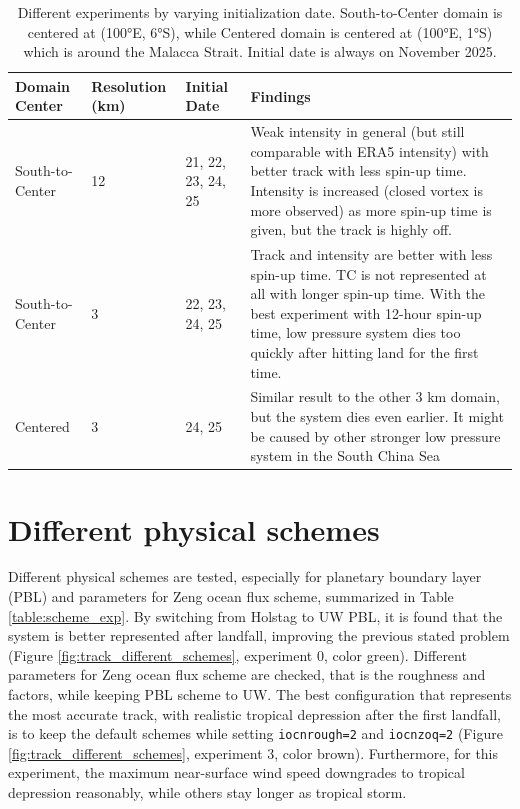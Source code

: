 \begin{table}[h] 
\centering
\begin{tabular}{p{3cm} p{2cm} p{2cm} p{7cm}}
\hline
\textbf{Domain Center} & \textbf{Resolution (km)} & \textbf{Initial Date} & \textbf{Findings} \\
\hline
South-to-Center & 12  & 21, 22, 23, 24, 25 & Weak intensity in general (but still comparable with ERA5 intensity) with better track with less spin-up time. Intensity is increased (closed vortex is more observed) as more spin-up time is given, but the track is highly off. \\
South-to-Center & 3 & 22, 23, 24, 25 & Track and intensity are better with less spin-up time. TC is not represented at all with longer spin-up time. With the best experiment with 12-hour spin-up time, low pressure system dies too quickly after hitting land for the first time. \\
Centered & 3 & 24, 25 & Similar result to the other 3 km domain, but the system dies even earlier. It might be caused by other stronger low pressure system in the South China Sea\\
\hline
\end{tabular}
\caption{Different experiments by varying initialization date. South-to-Center domain is centered at (100°E, 6°S), while Centered domain is centered at (100°E, 1°S) which is around the Malacca Strait. Initial date is always on November 2025.}
\label{table:diff_init}
\end{table}

\section*{Different physical schemes}

Different physical schemes are tested, especially for planetary boundary layer (PBL) and parameters for Zeng ocean flux scheme, summarized in Table \ref{table:scheme_exp}. By switching from Holstag to UW PBL, it is found that the system is better represented after landfall, improving the previous stated problem (Figure \ref{fig:track_different_schemes}, experiment 0, color green). Different parameters for Zeng ocean flux scheme are checked, that is the roughness and factors, while keeping PBL scheme to UW. The best configuration that represents the most accurate track, with realistic tropical depression after the first landfall, is to keep the default schemes while setting \texttt{iocnrough=2} and \texttt{iocnzoq=2} (Figure \ref{fig:track_different_schemes}, experiment 3, color brown). Furthermore, for this experiment, the maximum near-surface wind speed downgrades to tropical depression reasonably, while others stay longer as tropical storm.

